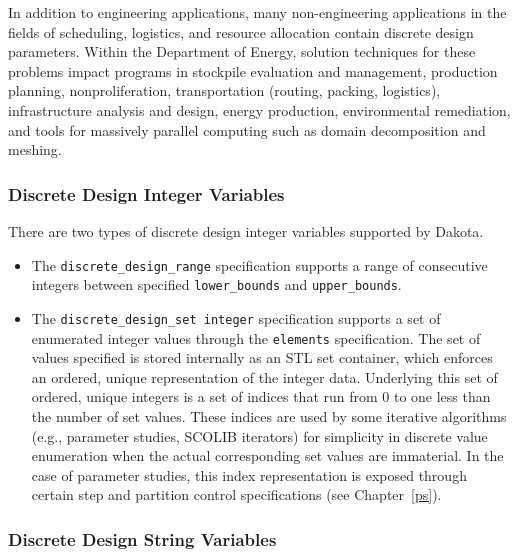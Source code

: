 In addition to engineering applications, many non-engineering
applications in the fields of scheduling, logistics, and resource
allocation contain discrete design parameters. Within the Department
of Energy, solution techniques for these problems impact programs in
stockpile evaluation and management, production planning,
nonproliferation, transportation (routing, packing, logistics),
infrastructure analysis and design, energy production, environmental
remediation, and tools for massively parallel computing such as domain
decomposition and meshing.

\subsubsection{Discrete Design Integer Variables}\label{variables:design:ddiv}

There are two types of discrete design integer variables supported by
Dakota.
\begin{itemize}

\item  The \texttt{discrete\_design\_range} specification supports a
range of consecutive integers between specified \texttt{lower\_bounds}
and \texttt{upper\_bounds}.

\item The \texttt{discrete\_design\_set integer} specification supports 
a set of enumerated integer values through the \texttt{elements} 
specification.  The set of values specified is stored internally as an 
STL set container, which enforces an ordered, unique representation of 
the integer data.  Underlying this set of ordered, unique integers is a 
set of indices that run from 0 to one less than the number of set values.
These indices are used by some iterative algorithms (e.g., parameter 
studies, SCOLIB iterators) for simplicity in discrete value enumeration 
when the actual corresponding set values are immaterial.  In the case of 
parameter studies, this index representation is exposed through certain 
step and partition control specifications (see Chapter~\ref{ps}).

\end{itemize}

\subsubsection{Discrete Design String Variables}\label{variables:design:ddsv}

